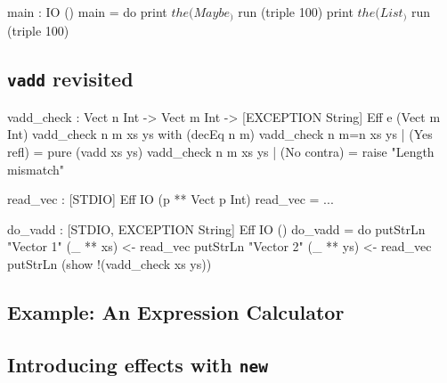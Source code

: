 \begin{code}
main : IO ()
main = do print $ the (Maybe _) $ run (triple 100)
          print $ the (List _) $ run (triple 100)
\end{code}

\subsection{\texttt{vadd} revisited}

\begin{code}
vadd_check : Vect n Int -> Vect m Int ->
             { [EXCEPTION String] } Eff e (Vect m Int)
vadd_check {n} {m} xs ys with (decEq n m)
  vadd_check {n} {m=n} xs ys | (Yes refl) = pure (vadd xs ys)
  vadd_check {n} {m}   xs ys | (No contra) = raise "Length mismatch"
\end{code}

\begin{code}
read_vec : { [STDIO] } Eff IO (p ** Vect p Int)
read_vec = ...
\end{code}

\begin{code}
do_vadd : { [STDIO, EXCEPTION String] } Eff IO ()
do_vadd = do putStrLn "Vector 1"
             (_ ** xs) <- read_vec
             putStrLn "Vector 2"
             (_ ** ys) <- read_vec
             putStrLn (show !(vadd_check xs ys))
\end{code}

\subsection{Example: An Expression Calculator}

\subsection{Introducing effects with \texttt{new}}
